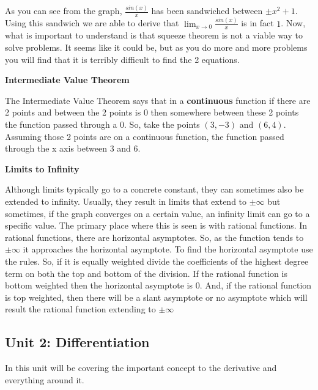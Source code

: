 \documentclass{article}
\begin{document}
As you can see from the graph, $\frac{sin(x)}{x}$ has been sandwiched between $\pm x^2+1$. Using this sandwich we are able to derive that $\lim_{x\to 0} \frac{sin(x)}{x}$ is in fact $1$.
\newline
\newline
Now, what is important to understand is that squeeze theorem is not a viable way to solve problems. It seems like it could be, but as you do more and more problems you will find that it is terribly difficult to find the 2 equations.
\begin{center}
    \textbf{Intermediate Value Theorem}
\end{center}
The Intermediate Value Theorem says that in a \textbf{continuous} function if there are 2 points and between the 2 points is 0 then somewhere between these 2 points the function passed through a 0. So, take the points $(3,-3)$ and $(6,4)$. Assuming those 2 points are on a continuous function, the function passed through the x axis between $3$ and $6$.
\begin{center}
    \textbf{Limits to Infinity}
\end{center}
Although limits typically go to a concrete constant, they can sometimes also be extended to infinity. Usually, they result in limits that extend to $\pm\infty$ but sometimes, if the graph converges on a certain value, an infinity limit can go to a specific value. The primary place where this is seen is with rational functions.
\newline
\newline
In rational functions, there are horizontal asymptotes. So, as the function tends to $\pm\infty$ it approaches the horizontal asymptote.
\newline
\newline
To find the horizontal asymptote use the rules. So, if it is equally weighted divide the coefficients of the highest degree term on both the top and bottom of the division. If the rational function is bottom weighted then the horizontal asymptote is 0. And, if the rational function is top weighted, then there will be a slant asymptote or no asymptote which will result the rational function extending to $\pm\infty$
\newpage
\begin{center}
    \section{Unit 2: Differentiation}
\end{center}
In this unit will be covering the important concept to the derivative and everything around it.
\end{document}
